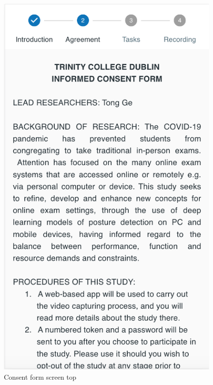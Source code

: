 \begin{minipage}{.5\textwidth}
\begin{figure}[H]
    \centering
    \includegraphics[width=\textwidth]{appendix/imgs/web-inform.png}
    \caption{Consent form screen top}
    \label{fig:web-inform}
\end{figure}
\end{minipage}

